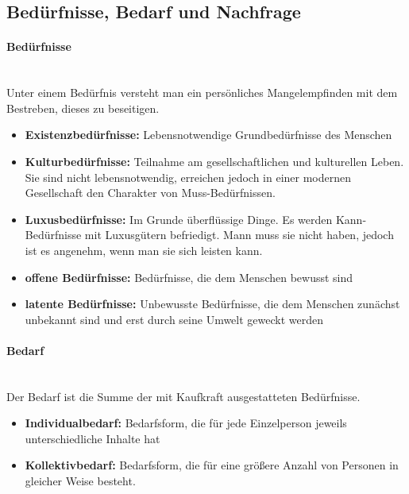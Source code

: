 
\subsection{Bedürfnisse, Bedarf und Nachfrage}

\paragraph{Bedürfnisse}~\\
Unter einem Bedürfnis versteht man ein persönliches Mangelempfinden mit dem Bestreben, dieses zu beseitigen.

\begin{itemize}
\setlength\itemsep{0em}
	\item \textbf{Existenzbedürfnisse:} Lebensnotwendige Grundbedürfnisse des Menschen
	\item \textbf{Kulturbedürfnisse:} Teilnahme am gesellschaftlichen und kulturellen Leben. Sie sind nicht lebensnotwendig, erreichen jedoch in einer modernen Gesellschaft den Charakter von Muss-Bedürfnissen.
	\item \textbf{Luxusbedürfnisse:} Im Grunde überflüssige Dinge. Es werden Kann-Bedürfnisse mit Luxusgütern befriedigt. Mann muss sie nicht haben, jedoch ist es angenehm, wenn man sie sich leisten kann.
	\item \textbf{offene Bedürfnisse:} Bedürfnisse, die dem Menschen bewusst sind
	\item \textbf{latente Bedürfnisse:} Unbewusste Bedürfnisse, die dem Menschen zunächst unbekannt sind und erst durch seine Umwelt geweckt werden
\end{itemize}
	
\paragraph{Bedarf}~\\
Der Bedarf ist die Summe der mit Kaufkraft ausgestatteten Bedürfnisse.

\begin{itemize}
\setlength\itemsep{0em}
	\item \textbf{Individualbedarf:} Bedarfsform, die für jede Einzelperson jeweils unterschiedliche Inhalte hat
	\item \textbf{Kollektivbedarf:} Bedarfsform, die für eine größere Anzahl von Personen in gleicher Weise besteht.
\end{itemize}
	
